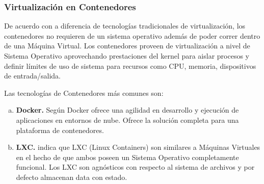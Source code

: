 \subsubsection{Virtualización en Contenedores}
De acuerdo con \cite{celesti2016exploring} a diferencia de tecnologías tradicionales de virtualización,
los contenedores no requieren de un sistema operativo además de poder correr dentro de una Máquina Virtual.
Los contenedores proveen de virtualización a nivel de Sistema Operativo aprovechando prestaciones del kernel
para aislar procesos y definir límites de uso de sistema para recursos como CPU, memoria, dispositivos de
entrada/salida.

Las tecnologías de Contenedores más comunes son:
\vspace{-1em}
\begin{enumerate}[a.]
  \item \textbf{Docker.}
    Según \cite{celesti2016exploring} Docker ofrece una agilidad en desarrollo y ejecución de aplicaciones
    en entornos de nube.
    Ofrece la solución completa para una plataforma de contenedores.
  \item \textbf{LXC.}
    \cite{celesti2016exploring} indica que LXC (Linux Containers) son  similares a Máquinas Virtuales
    en el hecho de que ambos poseen un Sistema Operativo completamente funcional.
    Los LXC son agnósticos con respecto al sistema de archivos y por defecto almacenan data con estado.
\end{enumerate}
\vspace{-1em}


%
%
%
%  
